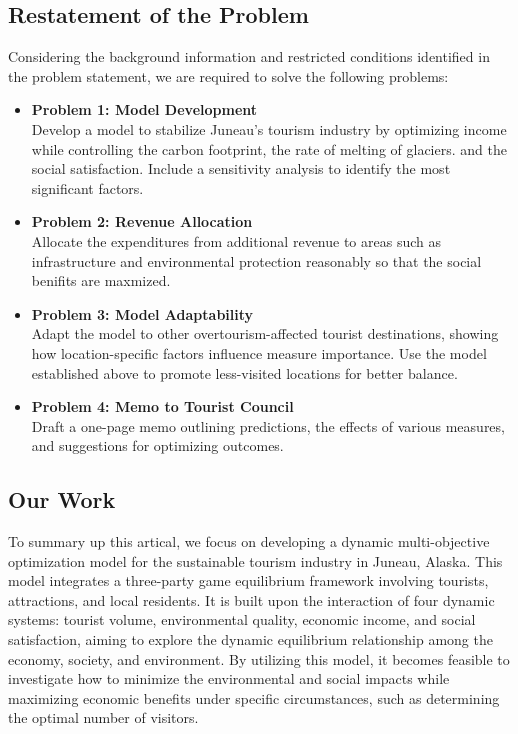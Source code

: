 \documentclass{mcmthesis}
\begin{document}
\subsection{Restatement of the Problem}
Considering the background information and restricted conditions identified in the problem statement, we are required to solve the following problems:
\begin{itemize}
  \item \textbf{Problem 1: Model Development} \\
    Develop a model to stabilize Juneau's tourism industry by optimizing income while controlling the carbon footprint, the rate of melting of glaciers. 
    and the social satisfaction. Include a sensitivity analysis to identify the most significant factors.
    
  \item \textbf{Problem 2: Revenue Allocation} \\
    Allocate the expenditures from additional revenue to areas such as infrastructure and environmental protection reasonably so that the social benifits are maxmized.
    
  \item \textbf{Problem 3: Model Adaptability} \\
    Adapt the model to other overtourism-affected tourist destinations, showing how location-specific factors influence measure importance. 
    Use the model established above to promote less-visited locations for better balance.
    
  \item \textbf{Problem 4: Memo to Tourist Council} \\
    Draft a one-page memo outlining predictions, the effects of various measures, and suggestions for optimizing outcomes.
\end{itemize}

\subsection{Our Work}
To summary up this artical, we focus on developing a dynamic multi-objective optimization model for the sustainable tourism industry in Juneau, Alaska. 
This model integrates a three-party game equilibrium framework involving tourists, attractions, and local residents. 
It is built upon the interaction of four dynamic systems: tourist volume, environmental quality, economic income, and social satisfaction, 
aiming to explore the dynamic equilibrium relationship among the economy, society, and environment. 
By utilizing this model, it becomes feasible to investigate how to minimize the environmental and social impacts while maximizing economic benefits under specific circumstances,
such as determining the optimal number of visitors.
\end{document}
